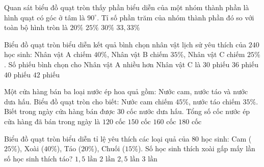 \begin{ex} %
Quan sát biểu đồ quạt tròn thấy phần biểu diễn của một nhóm thành phần là hình quạt có góc ở tâm là $90^{\circ}$. Tỉ số phần trăm của nhóm thành phần đó so với toàn bộ hình tròn là
\choice
{$20\%$}
{\True $25\%$}
{$30\%$}
{$33{,}33\%$}
\end{ex}

\begin{ex} %
Biểu đồ quạt tròn biểu diễn kết quả bình chọn nhân vật lịch sử yêu thích của $240$ học sinh: Nhân vật A chiếm $40\%$, Nhân vật B chiếm $35\%$, Nhân vật C chiếm $25\%$. Số phiếu bình chọn cho Nhân vật A nhiều hơn Nhân vật C là
\choice
{$30\text{ phiếu}$}
{\True $36\text{ phiếu}$}
{$40\text{ phiếu}$}
{$42\text{ phiếu}$}
\end{ex}

\begin{ex} %
Một cửa hàng bán ba loại nước ép hoa quả gồm: Nước cam, nước táo và nước dưa hấu. Biểu đồ quạt tròn cho biết: Nước cam chiếm $45\%$, nước táo chiếm $35\%$. Biết trong ngày cửa hàng bán được $30$ cốc nước dưa hấu. Tổng số cốc nước ép cửa hàng đã bán trong ngày là
\choice
{$120\text{ cốc}$}
{\True $150\text{ cốc}$}
{$160\text{ cốc}$}
{$180\text{ cốc}$}
\end{ex}

\begin{ex} %
Biểu đồ quạt tròn biểu diễn tỉ lệ yêu thích các loại quả của $80$ học sinh: Cam ($25\%$), Xoài ($40\%$), Táo ($20\%$), Chuối ($15\%$). Số học sinh thích xoài gấp mấy lần số học sinh thích táo?
\choice
{$1{,}5\text{ lần}$}
{\True $2\text{ lần}$}
{$2{,}5\text{ lần}$}
{$3\text{ lần}$}
\end{ex}

